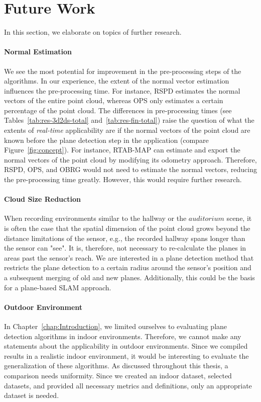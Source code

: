 \documentclass[main.tex]{subfiles}
\begin{document}
\section{Future Work}
In this section, we elaborate on topics of further research.


\paragraph{Normal Estimation}
We see the most potential for improvement in the pre-processing steps of the algorithms. In our experience, the extent of the normal vector estimation influences the pre-processing time. For instance, RSPD estimates the normal vectors of the entire point cloud, whereas OPS only estimates a certain percentage of the point cloud. The differences in pre-processing times (see Tables~\ref{tab:res-3d2ds-total} and~\ref{tab:res-fin-total}) raise the question of what the extents of \textit{real-time} applicability are if the normal vectors of the point cloud are known before the plane detection step in the application (compare Figure~\ref{fig:concept}). For instance, RTAB-MAP can estimate and export the normal vectors of the point cloud by modifying its odometry approach. Therefore, RSPD, OPS, and OBRG would not need to estimate the normal vectors, reducing the pre-processing time greatly. However, this would require further research.

\paragraph{Cloud Size Reduction}
When recording environments similar to the hallway or the $auditorium$ scene, it is often the case that the spatial dimension of the point cloud grows beyond the distance limitations of the sensor, e.g., the recorded hallway spans longer than the sensor can "see". It is, therefore, not necessary to re-calculate the planes in areas past the sensor's reach. We are interested in a plane detection method that restricts the plane detection to a certain radius around the sensor's position and a subsequent merging of old and new planes. Additionally, this could be the basis for a plane-based SLAM approach.

\paragraph{Outdoor Environment}
In Chapter~\ref{chap:Introduction}, we limited ourselves to evaluating plane detection algorithms in indoor environments. Therefore, we cannot make any statements about the applicability in outdoor environments. Since we compiled results in a realistic indoor environment, it would be interesting to evaluate the generalization of these algorithms. As discussed throughout this thesis, a comparison needs uniformity. Since we created an indoor dataset, selected datasets, and provided all necessary metrics and definitions, only an appropriate dataset is needed.
\end{document}

